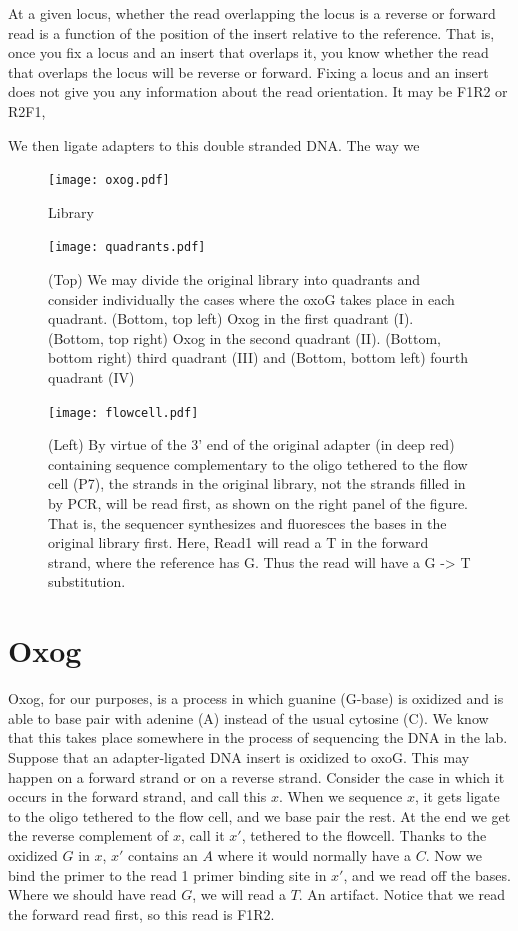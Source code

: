 \documentclass[a4paper]{article}
\begin{document}
At a given locus, whether the read overlapping the locus is a reverse or forward read is a function of the position of the insert relative to the reference. That is, once you fix a locus and an insert that overlaps it, you know whether the read that overlaps the locus will be reverse or forward. Fixing a locus and an insert does not give you any information about the read orientation. It may be F1R2 or R2F1, 

We then ligate adapters to this double stranded DNA. The way we 


\begin{figure}
  \texttt{[image: oxog.pdf]}
  \caption{Library }
  \label{fig:oxog}
\end{figure}


\begin{figure}
  \texttt{[image: quadrants.pdf]}
  \caption{(Top) We may divide the original library into quadrants and consider individually the cases where the oxoG takes place in each quadrant. (Bottom, top left) Oxog in the first quadrant (I). (Bottom, top right) Oxog in the second quadrant (II). (Bottom, bottom right) third quadrant (III) and (Bottom, bottom left) fourth quadrant (IV) }
  \label{fig:quadrants}
\end{figure}

\begin{figure}
  \texttt{[image: flowcell.pdf]}
  \caption{(Left) By virtue of the 3' end of the original adapter (in deep red) containing sequence complementary to the oligo tethered to the flow cell (P7), the strands in the original library, not the strands filled in by PCR, will be read first, as shown on the right panel of the figure. That is, the sequencer synthesizes and fluoresces the bases in the original library first. Here, Read1 will read a T in the forward strand, where the reference has G. Thus the read will have a G -> T substitution. }
  \label{fig:flowcell}
\end{figure}


\section{Oxog}

Oxog, for our purposes, is a process in which guanine (G-base) is oxidized and is able to base pair with adenine (A) instead of the usual cytosine (C). We know that this takes place somewhere in the process of sequencing the DNA in the lab. Suppose that an adapter-ligated DNA insert is oxidized to oxoG. This may happen on a forward strand or on a reverse strand. Consider the case in which it occurs in the forward strand, and call this $x$. When we sequence $x$, it gets ligate to the oligo tethered to the flow cell, and we base pair the rest. At the end we get the reverse complement of $x$, call it $x'$, tethered to the flowcell. Thanks to the oxidized $G$ in $x$, $x'$ contains an $A$ where it would normally have a $C$. Now we bind the primer to the read 1 primer binding site in $x'$, and we read off the bases. Where we should have read $G$, we will read a $T$. An artifact. Notice that we read the forward read first, so this read is F1R2.
\end{document}
